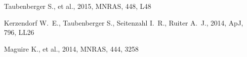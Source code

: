 \documentclass[11pt]{article}
\begin{document}
\bigskip



\justifyduplications


\bigskip


% 

\publications          %
\begin{thebibliography}{99}
 Taubenberger S., et al., 2015, MNRAS, 448, 
L48 

 Kerzendorf W.~E., Taubenberger S., 
Seitenzahl I.~R., Ruiter A.~J., 2014, ApJ, 796, LL26

 Maguire K., et al., 2014, MNRAS, 444, 3258
\end{thebibliography}
\bigskip



%


\otherfacilities    %


\bigskip

\end{document}
